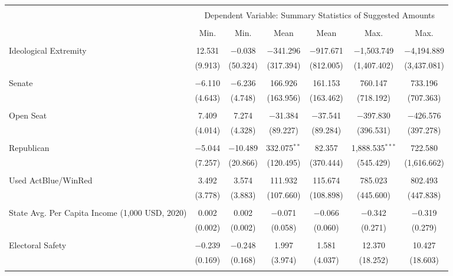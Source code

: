 
\begin{tabular}{@{\extracolsep{5pt}}lcccccc} 
\\[-1.8ex]\hline 
\hline \\[-1.8ex] 
 & \multicolumn{6}{c}{Dependent Variable: Summary Statistics of Suggested Amounts} \\ 
\cline{2-7} 
\\[-1.8ex] & Min. & Min. & Mean & Mean & Max. & Max. \\ 
\hline \\[-1.8ex] 
 Ideological Extremity & 12.531 & $-$0.038 & $-$341.296 & $-$917.671 & $-$1,503.749 & $-$4,194.889 \\ 
  & (9.913) & (50.324) & (317.394) & (812.005) & (1,407.402) & (3,437.081) \\ 
  & & & & & & \\ 
 Senate & $-$6.110 & $-$6.236 & 166.926 & 161.153 & 760.147 & 733.196 \\ 
  & (4.643) & (4.748) & (163.956) & (163.462) & (718.192) & (707.363) \\ 
  & & & & & & \\ 
 Open Seat & 7.409 & 7.274 & $-$31.384 & $-$37.541 & $-$397.830 & $-$426.576 \\ 
  & (4.014) & (4.328) & (89.227) & (89.284) & (396.531) & (397.278) \\ 
  & & & & & & \\ 
 Republican & $-$5.044 & $-$10.489 & 332.075$^{**}$ & 82.357 & 1,888.535$^{***}$ & 722.580 \\ 
  & (7.257) & (20.866) & (120.495) & (370.444) & (545.429) & (1,616.662) \\ 
  & & & & & & \\ 
 Used ActBlue/WinRed & 3.492 & 3.574 & 111.932 & 115.674 & 785.023 & 802.493 \\ 
  & (3.778) & (3.883) & (107.660) & (108.898) & (445.600) & (447.838) \\ 
  & & & & & & \\ 
 State Avg. Per Capita Income (1,000 USD, 2020) & 0.002 & 0.002 & $-$0.071 & $-$0.066 & $-$0.342 & $-$0.319 \\ 
  & (0.002) & (0.002) & (0.058) & (0.060) & (0.271) & (0.279) \\ 
  & & & & & & \\ 
 Electoral Safety & $-$0.239 & $-$0.248 & 1.997 & 1.581 & 12.370 & 10.427 \\ 
  & (0.169) & (0.168) & (3.974) & (4.037) & (18.252) & (18.603) \\ 
  & & & & & & \\ 

\end{tabular}
